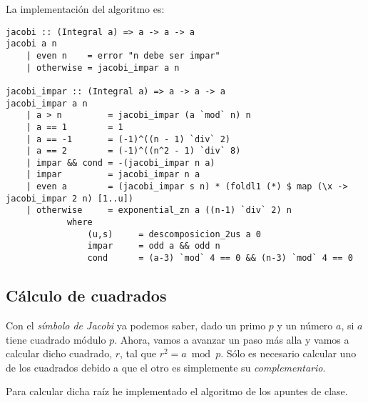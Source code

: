 \documentclass[10pt,spanish]{article}
\begin{document}
La implementación del algoritmo es:

\begin{verbatim}
jacobi :: (Integral a) => a -> a -> a
jacobi a n
    | even n    = error "n debe ser impar"
    | otherwise = jacobi_impar a n

jacobi_impar :: (Integral a) => a -> a -> a
jacobi_impar a n
    | a > n         = jacobi_impar (a `mod` n) n
    | a == 1        = 1
    | a == -1       = (-1)^((n - 1) `div` 2)
    | a == 2        = (-1)^((n^2 - 1) `div` 8)
    | impar && cond = -(jacobi_impar n a)
    | impar         = jacobi_impar n a
    | even a        = (jacobi_impar s n) * (foldl1 (*) $ map (\x -> jacobi_impar 2 n) [1..u])
    | otherwise     = exponential_zn a ((n-1) `div` 2) n
            where
                (u,s)     = descomposicion_2us a 0
                impar     = odd a && odd n 
                cond      = (a-3) `mod` 4 == 0 && (n-3) `mod` 4 == 0

\end{verbatim}

\subsection{\textcolor{rojo}Cálculo de cuadrados}
Con el \textit{\textcolor{rojo}{símbolo de Jacobi}} ya podemos saber, dado un primo $p$ y un número $a$, si $a$ tiene cuadrado módulo $p$. Ahora, vamos a avanzar un paso más alla y vamos a calcular dicho cuadrado, $r$, tal que $r^2 = a \bmod p$. Sólo es necesario calcular uno de los cuadrados debido a que el otro es simplemente su \textit{\textcolor{rojo}{complementario}}.

Para calcular dicha raíz he implementado el algoritmo de los apuntes de clase.
\end{document}
